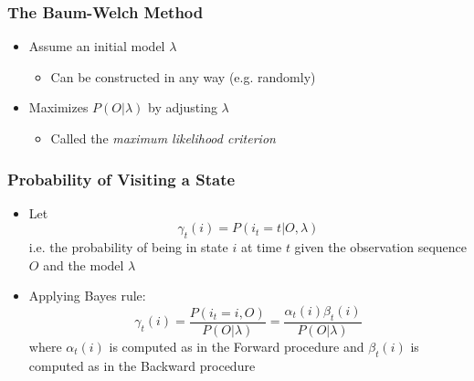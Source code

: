 \documentclass{beamer}
\begin{document}

\begin{frame}
    \frametitle{The Baum-Welch Method}
    \begin{itemize}
    \item Assume an initial model $\lambda$
        \begin{itemize}
        \item Can be constructed in any way (e.g. randomly)
        \end{itemize}
    \item Maximizes $P(O|\lambda)$ by adjusting $\lambda$
        \begin{itemize}
        \item Called the \emph{maximum likelihood criterion}
        \end{itemize}
    \end{itemize}
\end{frame}

\begin{frame}
    \frametitle{Probability of Visiting a State}
    \begin{itemize}
    \item Let
        \begin{displaymath}
            \gamma_t(i) = P(i_t = t|O,\lambda)
        \end{displaymath}
        i.e. the probability of being in state $i$ at time $t$ given the
        observation sequence $O$ and the model $\lambda$
    \item Applying Bayes rule:
        \begin{displaymath}
            \gamma_t(i) = \frac{P(i_t=i,O)}{P(O|\lambda)} = \frac{\alpha_t(i)\beta_t(i)}{P(O|\lambda)}
        \end{displaymath}
        where $\alpha_t(i)$ is computed as in the Forward procedure and
        $\beta_t(i)$ is computed as in the Backward procedure
    \end{itemize}
\end{frame}

\end{document}

